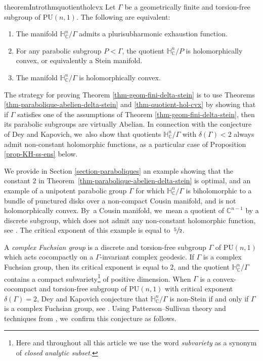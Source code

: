 \documentclass[JEP,XML,SOM,Unicode,NoEqCountersInSection,published]{cedram}
\theoremstyle{definition}
\newcommand{\C}{\mathbb{C}}
\newcommand{\HNC}{\mathbb{H}^{n}_{\C}}
\newcommand{\PU}{\mathrm{PU}}
\def\C{\mathbb{C}}
\newcommand{\HNC}{\mathbb{H}^{n}_{\C}}
\newcommand{\PU}{\mathrm{PU}}
\begin{document}
\begin{restatable}{theoremIntro}{thmquotientholcvx}\label{thm-quotient-hol-cvx}
Let $\Gamma$ be a geometrically finite and torsion-free subgroup of $\PU(n,1)$. The following are equivalent: 
\begin{enumerate}
\item\label{thm-quotient-hol-cvx1} The manifold $\HNC/\Gamma$ admits a plurisubharmonic exhaustion function.
\item\label{thm-quotient-hol-cvx2} For any parabolic subgroup $P<\Gamma$, the quotient $\HNC/P$ is holomorphically convex, or equivalently a Stein manifold.
\item\label{thm-quotient-hol-cvx3} The manifold $\HNC/\Gamma$ is holomorphically convex.
\end{enumerate}
\end{restatable}

The strategy for proving Theorem \ref{thm-geom-fini-delta-stein} is to use Theorems \ref{thm-parabolique-abelien-delta-stein} and \ref{thm-quotient-hol-cvx} by showing that if $\Gamma$ satisfies one of the assumptions of Theorem \ref{thm-geom-fini-delta-stein}, then its parabolic subgroups are virtually Abelian. In connection with the conjecture of Dey and Kapovich, we~also show that quotients $\HNC/\Gamma$ with $\delta(\Gamma)<2$ always admit non-constant holomorphic functions, as a particular case of Proposition \ref{prop-KH-ss-ens} below.

We provide in Section \ref{section-paraboliques} an example showing that the constant $2$ in Theorem~\ref{thm-parabolique-abelien-delta-stein} is optimal, and an example of a unipotent parabolic group $\Gamma$ for which $\HNC/\Gamma$ is biholomorphic to a bundle of punctured disks over a non-compact Cousin manifold, and is not holomorphically convex. By~a Cousin manifold, we~mean a quotient of $\C^{n-1}$ by a discrete subgroup, which does not admit any non-constant holomorphic function, see \cite{cousinFonctionsTriplementPeriodiques1910,kopfermannMaximaleUntergruppenAbelscher1964,abeToroidalGroups2001}. The critical exponent of this example is equal to~$\sfrac{5}{2}$.

A \textit{complex Fuchsian group} is a discrete and torsion-free subgroup $\Gamma$ of $\PU(n,1)$ which acts cocompactly on a $\Gamma$\nobreakdash-invariant complex geodesic. If $\Gamma$ is a complex Fuchsian group, then its critical exponent is equal to 2, and the quotient $\HNC/\Gamma$ contains a compact subvariety\footnote{Here and throughout all this article we use the word \textit{subvariety} as a synonym of \textit{closed analytic subset}.} of positive dimension. When $\Gamma$ is a convex-cocompact and torsion-free subgroup of $\PU(n,1)$ with critical exponent $\delta(\Gamma)=2$, Dey and Kapovich conjecture that $\HNC/\Gamma$ is non-Stein if and only if $\Gamma$ is a complex Fuchsian group, see \cite[Conj.\,17]{deyNoteComplexhyperbolicKleinian2020}. Using Patterson--Sullivan theory and techniques from \cite{connellNaturalFlowCritical2023}, we~confirm this conjecture as follows.
\end{document}
